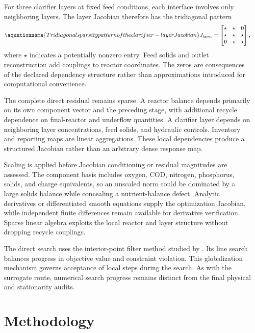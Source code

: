 For three clarifier layers at fixed feed conditions, each interface involves only neighboring layers. The layer Jacobian therefore has the tridiagonal pattern
\begin{equation}
\equationname{Tridiagonal sparsity pattern of the clarifier-layer Jacobian}
J_{\rm layer}=\begin{bmatrix}\star&\star&0\\\star&\star&\star\\0&\star&\star\end{bmatrix},
\end{equation}
where $\star$ indicates a potentially nonzero entry. Feed solids and outlet reconstruction add couplings to reactor coordinates. The zeros are consequences of the declared dependency structure rather than approximations introduced for computational convenience.

The complete direct residual remains sparse. A reactor balance depends primarily on its own component vector and the preceding stage, with additional recycle dependence on final-reactor and underflow quantities. A clarifier layer depends on neighboring layer concentrations, feed solids, and hydraulic controls. Inventory and reporting maps are linear aggregations. These local dependencies produce a structured Jacobian rather than an arbitrary dense response map.

Scaling is applied before Jacobian conditioning or residual magnitudes are assessed. The component basis includes oxygen, COD, nitrogen, phosphorus, solids, and charge equivalents, so an unscaled norm could be dominated by a large solids balance while concealing a nutrient-balance defect. Analytic derivatives or differentiated smooth equations supply the optimization Jacobian, while independent finite differences remain available for derivative verification. Sparse linear algebra exploits the local reactor and layer structure without dropping recycle couplings.

The direct search uses the interior-point filter method studied by \citet{WachterBiegler2006}. Its line search balances progress in objective value and constraint violation. This globalization mechanism governs acceptance of local steps during the search. As with the surrogate route, numerical search progress remains distinct from the final physical and stationarity audits.

\section{Methodology}

